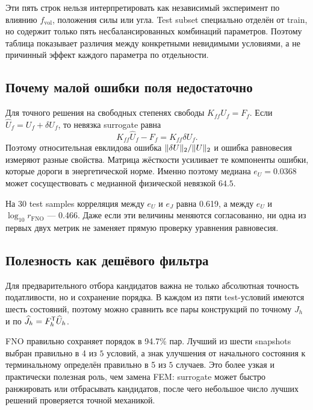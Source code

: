 Эти пять строк нельзя интерпретировать как независимый эксперимент по влиянию $f_{\mathrm{vol}}$, положения силы или угла. Test subset специально отделён от train, но содержит только пять несбалансированных комбинаций параметров. Поэтому таблица показывает различия между конкретными невидимыми условиями, а не причинный эффект каждого параметра по отдельности.

\subsection{Почему малой ошибки поля недостаточно}
\label{subsec:practical-v06-physics-gap}

Для точного решения на свободных степенях свободы $K_{ff}U_f=F_f$. Если $\widehat U_f=U_f+\delta U_f$, то невязка surrogate равна
\begin{equation}
\label{eq:practical-v06-residual-error-link}
 K_{ff}\widehat U_f-F_f
 =
 K_{ff}\delta U_f.
\end{equation}
Поэтому относительная евклидова ошибка $\lVert\delta U\rVert_2/\lVert U\rVert_2$ и ошибка равновесия измеряют разные свойства. Матрица жёсткости усиливает те компоненты ошибки, которые дороги в энергетической норме. Именно поэтому медиана $e_U=0.0368$ может сосуществовать с медианной физической невязкой $64.5$.

На $30$ test samples корреляция между $e_U$ и $e_J$ равна 0.619, а между $e_U$ и $\log_{10}r_{\mathrm{FNO}}$ --- 0.466. Даже если эти величины меняются согласованно, ни одна из первых двух метрик не заменяет прямую проверку уравнения равновесия.

\subsection{Полезность как дешёвого фильтра}
\label{subsec:practical-v06-screening}

Для предварительного отбора кандидатов важна не только абсолютная точность податливости, но и сохранение порядка. В каждом из пяти test-условий имеются шесть состояний, поэтому можно сравнить все пары конструкций по точному $J_h$ и по $\widehat J_h=F_h^{\mathsf{T}}\widehat U_h$.

FNO правильно сохраняет порядок в 94.7\% пар. Лучший из шести snapshots выбран правильно в 4 из $5$ условий, а знак улучшения от начального состояния к терминальному определён правильно в 5 из $5$ случаев. Это более узкая и практически полезная роль, чем замена FEM: surrogate может быстро ранжировать или отбрасывать кандидатов, после чего небольшое число лучших решений проверяется точной механикой.

